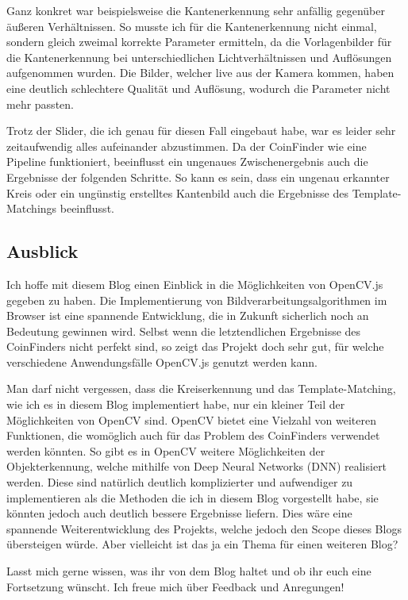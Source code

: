 Ganz konkret war beispielsweise die Kantenerkennung sehr anfällig gegenüber äußeren Verhältnissen. So musste ich für die Kantenerkennung nicht einmal, sondern gleich zweimal korrekte Parameter ermitteln, da die Vorlagenbilder für die Kantenerkennung bei unterschiedlichen Lichtverhältnissen und Auflösungen aufgenommen wurden. Die Bilder, welcher live aus der Kamera kommen, haben eine deutlich schlechtere Qualität und Auflösung, wodurch die Parameter nicht mehr passten.

Trotz der Slider, die ich genau für diesen Fall eingebaut habe, war es leider sehr zeitaufwendig alles aufeinander abzustimmen. Da der CoinFinder wie eine Pipeline funktioniert, beeinflusst ein ungenaues Zwischenergebnis auch die Ergebnisse der folgenden Schritte. So kann es sein, dass ein ungenau erkannter Kreis oder ein ungünstig erstelltes Kantenbild auch die Ergebnisse des Template-Matchings beeinflusst. 

\subsection{Ausblick}
Ich hoffe mit diesem Blog einen Einblick in die Möglichkeiten von OpenCV.js gegeben zu haben. Die Implementierung von Bildverarbeitungsalgorithmen im Browser ist eine spannende Entwicklung, die in Zukunft sicherlich noch an Bedeutung gewinnen wird. Selbst wenn die letztendlichen Ergebnisse des CoinFinders nicht perfekt sind, so zeigt das Projekt doch sehr gut, für welche verschiedene Anwendungsfälle OpenCV.js genutzt werden kann.

Man darf nicht vergessen, dass die Kreiserkennung und das Template-Matching, wie ich es in diesem Blog implementiert habe, nur ein kleiner Teil der Möglichkeiten von OpenCV sind. OpenCV bietet eine Vielzahl von weiteren Funktionen, die womöglich auch für das Problem des CoinFinders verwendet werden könnten. So gibt es in OpenCV weitere Möglichkeiten der Objekterkennung, welche mithilfe von Deep Neural Networks (DNN) realisiert werden. Diese sind natürlich deutlich komplizierter und aufwendiger zu implementieren als die Methoden die ich in diesem Blog vorgestellt habe, sie könnten jedoch auch deutlich bessere Ergebnisse liefern. Dies wäre eine spannende Weiterentwicklung des Projekts, welche jedoch den Scope dieses Blogs übersteigen würde. Aber vielleicht ist das ja ein Thema für einen weiteren Blog?

Lasst mich gerne wissen, was ihr von dem Blog haltet und ob ihr euch eine Fortsetzung wünscht. Ich freue mich über Feedback und Anregungen!